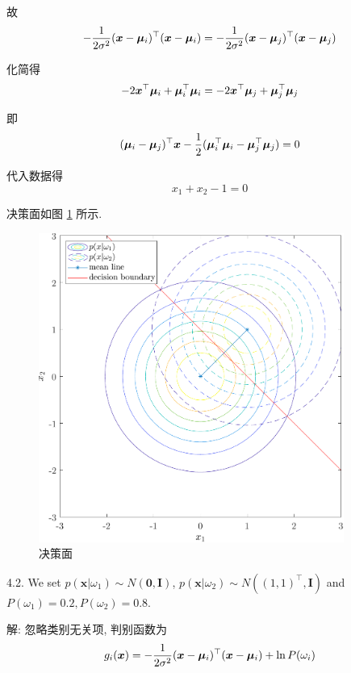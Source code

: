 \documentclass{article}
\begin{document}
故
\begin{equation}
  -\frac{1}{2\sigma^2}(\bm{x}-\bm{\mu}_i)^{\top}(\bm{x}-\bm{\mu}_i)=-\frac{1}{2\sigma^2}(\bm{x}-\bm{\mu}_j)^{\top}(\bm{x}-\bm{\mu}_j)
\end{equation}

化简得
\begin{equation}
  -2\bm{x}^{\top}\bm{\mu}_i+\bm{\mu}_i^{\top}\bm{\mu}_i=-2\bm{x}^{\top}\bm{\mu}_j+\bm{\mu}_j^{\top}\bm{\mu}_j
\end{equation}

即
\begin{equation}
  (\bm{\mu}_i-\bm{\mu}_j)^{\top}\bm{x}-\frac{1}{2}(\bm{\mu}_i^{\top}\bm{\mu}_i-\bm{\mu}_j^{\top}\bm{\mu}_j)=0
\end{equation}

代入数据得
\begin{equation}
  x_1+x_2-1=0
\end{equation}

决策面如图 \ref{fig:mvnpdf-1} 所示.

\begin{figure}
  \centering
  \includegraphics[width=10cm]{mvnpdf-1.pdf}
  \caption{决策面}
  \label{fig:mvnpdf-1}
\end{figure}

4.2. We set $p(\bm{x}|\omega_1)\sim N(\bm{0},\bm{I})$, $p(\bm{x}|\omega_2)\sim N\left((1,1)^{\top},\bm{I}\right)$ and $P(\omega_1)=0.2, P(\omega_2)=0.8$.

解: 忽略类别无关项, 判别函数为
\begin{equation}
  g_i(\bm{x})=-\frac{1}{2\sigma^2}(\bm{x}-\bm{\mu}_i)^{\top}(\bm{x}-\bm{\mu}_i)+\ln P(\omega_i)
\end{equation}
\end{document}
